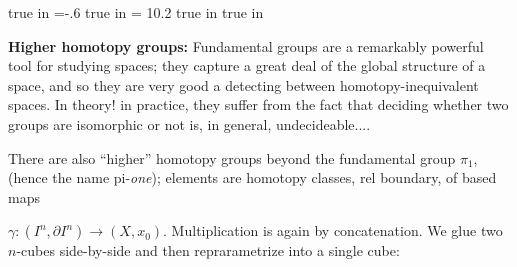 

\overfullrule=0pt
\parindent=0pt

\nopagenumbers




 true in
\hoffset=-.6 true in
\hsize = 10.2 true in
 true in



\def\cltr{\Red}		  %

\loadmsbm



\def\ctln{\centerline}
\def\u{\underbar}
\def\ssk{\smallskip}
\def\msk{\medskip}
\def\bsk{\bigskip}
\def\hsk{\hskip.1in}
\def\hhsk{\hskip.2in}
\def\dsl{\displaystyle}
\def\hskp{\hskip1.5in}

\def\lra{$\Leftrightarrow$ }
\def\ra{\rightarrow}
\def\mpto{\logmapsto}
\def\pu{\pi_1}
\def\mpu{$\pi_1$}
\def\sig{\Sigma}
\def\msig{$\Sigma$}
\def\ep{\epsilon}
\def\sset{\subseteq}
\def\del{\partial}
\def\inv{^{-1}}
\def\wtl{\widetilde}
\def\del{\partial}
\def\delp{\partial^\prime}
\def\delpp{\partial^{\prime\prime}}
\def\sgn{{\roman{sgn}}}
\def\wtih{\widetilde{H}}
\def\bbz{{\Bbb Z}}
\def\bbr{{\Bbb R}}
\def\rtar{$\Rightarrow$}

\def\cltr{\Red}		  %
\def\cltb{\Blue}		  %
\def\cltg{\PineGreen}	  %





{\bf Higher homotopy groups:} Fundamental groups are a remarkably powerful
tool for studying spaces; they capture a great deal of the global
structure of a space, and so they are very good a detecting
between homotopy-inequivalent spaces. In theory! \cltr{{\bf But}} in practice,
they suffer from the fact that deciding whether two groups are 
isomorphic or not is, in general, undecideable.... 

\msk

There are also ``higher'' homotopy groups beyond the fundamental group \mpu ,
(hence the name pi-{\it one}); elements are homotopy classes, rel boundary, 
of based maps \hfill

$\gamma:(I^n,\del I^n)\ra(X,x_0)$. Multiplication is again by
concatenation. We glue two $n$-cubes side-by-side and then
reprarametrize into a single cube: 

